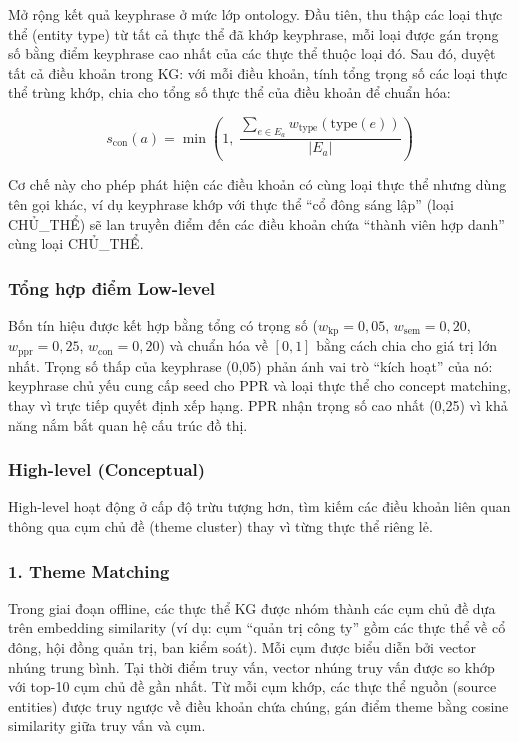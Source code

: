 Mở rộng kết quả keyphrase ở mức lớp ontology. Đầu tiên, thu thập các loại thực
thể (entity type) từ tất cả thực thể đã khớp keyphrase, mỗi loại được gán trọng
số bằng điểm keyphrase cao nhất của các thực thể thuộc loại đó. Sau đó, duyệt tất
cả điều khoản trong KG: với mỗi điều khoản, tính tổng trọng số các loại thực thể
trùng khớp, chia cho tổng số thực thể của điều khoản để chuẩn hóa:

\begin{equation}
  s_\text{con}(a) = \min\!\left(1,\;
    \frac{\displaystyle\sum_{e \in E_a} w_\text{type}\!\left(\text{type}(e)\right)}
         {|E_a|}
  \right)
  \label{eq:concept-score}
\end{equation}

Cơ chế này cho phép phát hiện các điều khoản có cùng loại thực thể nhưng dùng tên
gọi khác, ví dụ keyphrase khớp với thực thể ``cổ đông sáng lập'' (loại CHỦ\_THỂ)
sẽ lan truyền điểm đến các điều khoản chứa ``thành viên hợp danh'' cùng loại
CHỦ\_THỂ.

\subsubsection*{Tổng hợp điểm Low-level}

Bốn tín hiệu được kết hợp bằng tổng có trọng số ($w_\text{kp} = 0{,}05$,
$w_\text{sem} = 0{,}20$, $w_\text{ppr} = 0{,}25$, $w_\text{con} = 0{,}20$) và
chuẩn hóa về $[0, 1]$ bằng cách chia cho giá trị lớn nhất. Trọng số thấp của
keyphrase (0,05) phản ánh vai trò ``kích hoạt'' của nó: keyphrase chủ yếu cung
cấp seed cho PPR và loại thực thể cho concept matching, thay vì trực tiếp quyết
định xếp hạng. PPR nhận trọng số cao nhất (0,25) vì khả năng nắm bắt quan hệ cấu
trúc đồ thị.

\subsubsection{High-level (Conceptual)}
\label{subsubsec:high-level}

High-level hoạt động ở cấp độ trừu tượng hơn, tìm kiếm các điều khoản liên quan
thông qua cụm chủ đề (theme cluster) thay vì từng thực thể riêng lẻ.

\subsubsection*{1. Theme Matching}

Trong giai đoạn offline, các thực thể KG được nhóm thành các cụm chủ đề dựa trên
embedding similarity (ví dụ: cụm ``quản trị công ty'' gồm các thực thể về cổ đông,
hội đồng quản trị, ban kiểm soát). Mỗi cụm được biểu diễn bởi vector nhúng trung
bình. Tại thời điểm truy vấn, vector nhúng truy vấn được so khớp với top-10 cụm
chủ đề gần nhất. Từ mỗi cụm khớp, các thực thể nguồn (source entities) được truy
ngược về điều khoản chứa chúng, gán điểm theme bằng cosine similarity giữa truy
vấn và cụm.

